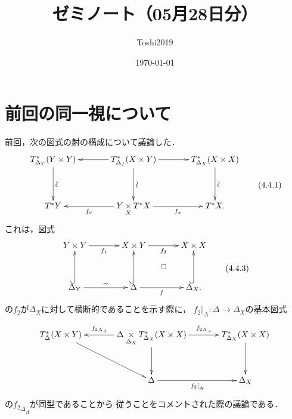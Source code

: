 \documentclass[leqno, 10pt, a4paper, dvipdfmx]{jsarticle}
\title{ゼミノート（05月28日分）}
\author{Toshi2019}
\date{\today}
\theoremstyle{definition}
\numberwithin{equation}{section}
\newcommand{\mres}[2][]{{\left.{#1}\right\rvert}_{#2}}
\newcommand{\pb}[1][]{\mathbin{\mathop{\times}\limits_{#1}}}
\newcommand{\dpb}[1][]{\mathbin{\mathop{\times}\limits_{#1}}}
\theoremstyle{mystyle}
\newcommand{\mpb}[1][]{{#1}_{\pi}} %
\newcommand{\mdiff}[1][]{{#1}_{d}} %
\newcommand{\cotb}[1][]{T^{\ast}{#1}}
\newcommand{\diag}[1][]{\Delta_{#1}}
\begin{document}
\maketitle
\tableofcontents

\section{前回の同一視について}
前回，次の図式の射の構成について議論した．
\begin{equation}%
  \vcenter{\xymatrix@C=36pt@R=36pt{
    T^{\ast}_{\diag[Y]}(Y\times Y)
    \ar[d]^-{\rotatebox{90}{\(\sim\)}}
    &
    T^{\ast}_{\diag[f]}(X\times Y)
    \ar[d]^-{\rotatebox{90}{\(\sim\)}}
    \ar[l]
    \ar[r]
    &
    T^{\ast}_{\diag[X]}(X\times X)
    \ar[d]^-{\rotatebox{90}{\(\sim\)}}
    \\
    \cotb[Y]
    &
    Y\pb[X]\cotb[X]
    \ar[l]^-{\mdiff[f]}
    \ar[r]_-{\mpb[f]}
    &
    \cotb[X].
  }}\tag{4.4.1}
\end{equation}
これは，図式
\begin{equation}%
  \vcenter{\xymatrix@C=36pt@R=36pt{
    Y\times Y
    \ar[r]_-{f_1}
    &
    X\times Y
    \ar@{}[rd]|\square
    \ar[r]_-{f_2}
    &
    X\times X
    \\
    \diag[Y]  
    \ar@{^{(}->}[u]^-{}
    \ar[r]^-{{\sim}}
    &
    \diag[]
    \ar@{^{(}->}[u]^-{}
    \ar[r]_-{f}
    &
    \diag[X].
    \ar@{^{(}->}[u]^-{}
  }}\tag{4.4.3}
\end{equation}
の\(f_2\)が\(\diag[X]\)に対して横断的であることを示す際に，
\(\mres[f_2]{\diag}\colon\diag[]\to\diag[X]\)の基本図式
\[
  \vcenter{\xymatrix@C=36pt@R=36pt{
  T^{\ast}_{\diag[]}(X\times Y)
  \ar[dr]^-{}
  &
  \diag[]\dpb[{\diag[X]}]T^{\ast}_{\diag[X]}(X\times X)
  \ar[d]^-{}
  \ar[l]_-{\mdiff[{f_2}_{\diag[]}]}
  \ar[r]^-{\mpb[{f_2}_{\diag[]}]}
  &
  T^{\ast}_{\diag[X]}(X\times X)
  \ar[d]^-{}
  \\
  &
  \diag[]
  \ar[r]_-{\mres[{f_2}]{\diag[]}}
  &
  \diag[X]
}}\]
の\(\mdiff[{f_2}_{\diag[]}]\)が同型であることから
従うことをコメントされた際の議論である．
\end{document}
